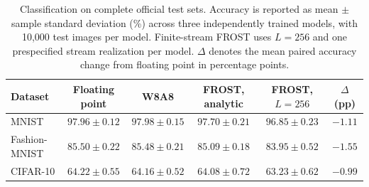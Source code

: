 \begin{table}[t]
\centering
\caption{Classification on complete official test sets. Accuracy is reported as mean $\pm$ sample standard deviation (\%) across three independently trained models, with 10,000 test images per model. Finite-stream FROST uses $L=256$ and one prespecified stream realization per model. $\Delta$ denotes the mean paired accuracy change from floating point in percentage points.}
\label{tab:dataset_results}
\begin{tabular}{lccccc}
\toprule
Dataset & Floating point & W8A8 & FROST, analytic & FROST, $L=256$ & $\Delta$ (pp) \\
\midrule
MNIST & $97.96\pm0.12$ & $97.98\pm0.15$ & $97.70\pm0.21$ & $96.85\pm0.23$ & $-1.11$ \\
Fashion-MNIST & $85.50\pm0.22$ & $85.48\pm0.21$ & $85.09\pm0.18$ & $83.95\pm0.52$ & $-1.55$ \\
CIFAR-10 & $64.22\pm0.55$ & $64.16\pm0.52$ & $64.08\pm0.72$ & $63.23\pm0.62$ & $-0.99$ \\
\bottomrule
\end{tabular}
\end{table}
